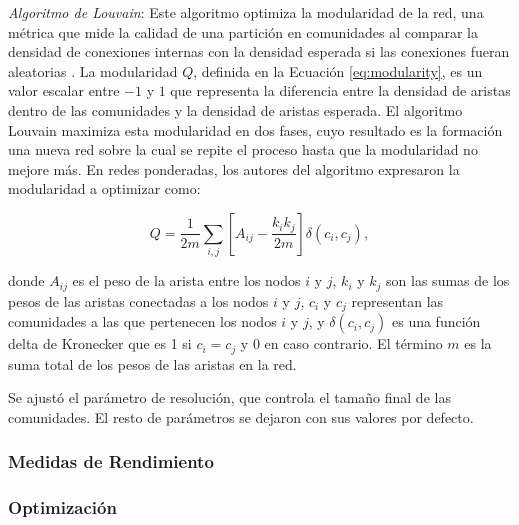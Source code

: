 \textit{Algoritmo de Louvain}: Este algoritmo optimiza la modularidad de la red, una métrica que mide la calidad de una partición en comunidades al comparar la densidad de conexiones internas con la densidad esperada si las conexiones fueran aleatorias \cite{Blondel2008Louvain}. La modularidad \( Q \), definida en la Ecuación \ref{eq:modularity}, es un valor escalar entre \(-1\) y \(1\) que representa la diferencia entre la densidad de aristas dentro de las comunidades y la densidad de aristas esperada. El algoritmo Louvain maximiza esta modularidad en dos fases, cuyo resultado es la formación una nueva red sobre la cual se repite el proceso hasta que la modularidad no mejore más. En redes ponderadas, los autores del algoritmo expresaron la modularidad a optimizar como:

\begin{equation}
	\label{eq:modularity}
	Q = \frac{1}{2m} \sum_{i,j} \left[ A_{ij} - \frac{k_i k_j}{2m} \right] \delta(c_i, c_j),
\end{equation}

\noindent donde \( A_{ij} \) es el peso de la arista entre los nodos \( i \) y \( j \), \( k_i \) y \( k_j \) son las sumas de los pesos de las aristas conectadas a los nodos \( i \) y \( j \), \( c_i \) y \( c_j \) representan las comunidades a las que pertenecen los nodos \( i \) y \( j \), y \( \delta(c_i, c_j) \) es una función delta de Kronecker que es 1 si \( c_i = c_j \) y 0 en caso contrario. El término \( m \) es la suma total de los pesos de las aristas en la red.

\noindent Se ajustó el parámetro de resolución, que controla el tamaño final de las comunidades. El resto de parámetros se dejaron con sus valores por defecto.

\subsubsection*{Medidas de Rendimiento}

\subsubsection*{Optimización}